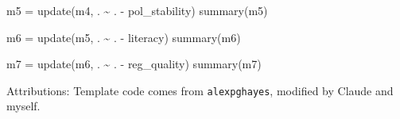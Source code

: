 \documentclass[
  letterpaper,
  DIV=11,
  numbers=noendperiod]{scrartcl}
\newenvironment{Shaded}{\begin{snugshade}}{\end{snugshade}}
\newcommand{\FunctionTok}[1]{\textcolor[rgb]{0.28,0.35,0.67}{#1}}
\newcommand{\NormalTok}[1]{\textcolor[rgb]{0.00,0.23,0.31}{#1}}
\newcommand{\OtherTok}[1]{\textcolor[rgb]{0.00,0.23,0.31}{#1}}
\newcommand{\SpecialCharTok}[1]{\textcolor[rgb]{0.37,0.37,0.37}{#1}}
\begin{document}
\begin{Shaded}
\begin{Highlighting}[]
\NormalTok{m5 }\OtherTok{=} \FunctionTok{update}\NormalTok{(m4, . }\SpecialCharTok{\textasciitilde{}}\NormalTok{ . }\SpecialCharTok{{-}}\NormalTok{ pol\_stability)}
\FunctionTok{summary}\NormalTok{(m5)}

\NormalTok{m6 }\OtherTok{=} \FunctionTok{update}\NormalTok{(m5, . }\SpecialCharTok{\textasciitilde{}}\NormalTok{ . }\SpecialCharTok{{-}}\NormalTok{ literacy)}
\FunctionTok{summary}\NormalTok{(m6)}

\NormalTok{m7 }\OtherTok{=} \FunctionTok{update}\NormalTok{(m6, . }\SpecialCharTok{\textasciitilde{}}\NormalTok{ . }\SpecialCharTok{{-}}\NormalTok{ reg\_quality)}
\FunctionTok{summary}\NormalTok{(m7)}
\end{Highlighting}
\end{Shaded}

\vfill

Attributions: Template code comes from \texttt{alexpghayes}, modified by
Claude and myself.
\end{document}
